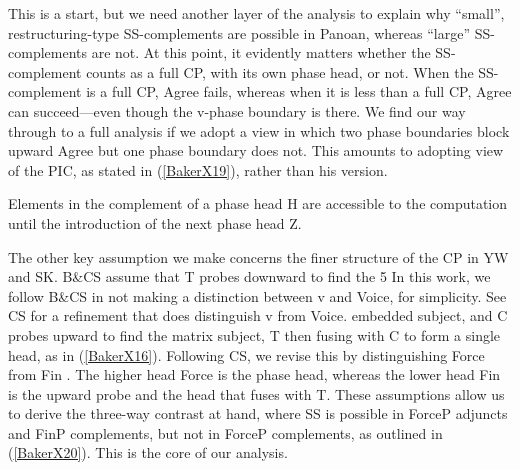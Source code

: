 \documentclass[output=paper,colorlinks,citecolor=brown,
]{langscibook}
\begin{document}
This is a start, but we need another layer of the analysis to explain why “small”, restructuring-type SS-complements are possible in Panoan, whereas “large” SS-complements are not. At this point, it evidently matters whether the SS-complement counts as a full CP, with its own phase head, or not. When the SS-complement is a full CP, Agree fails, whereas when it is less than a full CP, Agree can succeed—even though the v-phase boundary is there. We find our way through to a full analysis if we adopt a view in which two phase boundaries block upward Agree but one phase boundary does not. This amounts to adopting  view of the PIC, as stated in (\ref{BakerX19}), rather than his \citeyearpar{chomsky2000minimalist} version.

\begin{exe}
    \ex Elements in the complement of a phase head H are accessible to the computation until the introduction of the next phase head Z. \label{BakerX19}
\end{exe}

The other key assumption we make concerns the finer structure of the CP in YW and SK. B\&CS assume that T probes downward to find the
5 In this work, we follow B\&CS in not making a distinction between v and Voice, for simplicity. See CS for a refinement that does distinguish v from Voice.
embedded subject, and C probes upward to find the matrix subject, T then fusing with C to form a single head, as in (\ref{BakerX16}). Following CS, we revise this by distinguishing Force from Fin \citep{rizzi1997fine}. The higher head Force is the phase head, whereas the lower head Fin is the upward probe and the head that fuses with T. These assumptions allow us to derive the three-way contrast at hand, where SS is possible in ForceP adjuncts and FinP complements, but not in ForceP complements, as outlined in (\ref{BakerX20}). This is the core of our analysis.
\end{document}
